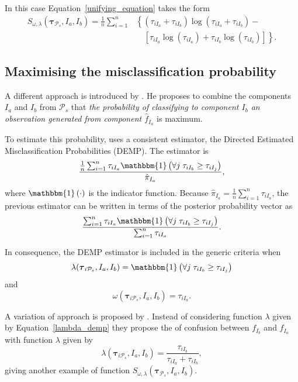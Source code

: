 \documentclass[10pt, a4paper]{article}
\newcommand{\m}[1]{\boldsymbol{#1}}
\begin{document}
\begin{spacing}{1.9}
In this case Equation~\ref{unifying_equation} takes the form
\[
\begin{split}
S_{\omega, \lambda}( \m\tau_{\mathcal{P}_s},  I_a,  I_b) = \frac{1}{n} \sum_{i=1}^n & \left\{(\tau_{iI_a}+\tau_{iI_b}) \log(\tau_{iI_a} + \tau_{iI_b}) - \right.\\ 
&\quad \left.\left[ \tau_{iI_a} \log(\tau_{iI_a}) + \tau_{iI_b} \log(\tau_{iI_b}) \right]\right\}.
\end{split}
\]


\subsection{Maximising the misclassification probability}
\label{missclassification_section}

A different approach is introduced by \cite{hennig2010methods}. He proposes to combine the components $I_a$ and $I_b$ from $ \mathcal{P}_s$ that \emph{the probability of classifying to component $I_b$ an observation generated from component $\hat{f}_{I_a}$ } is maximum.

To estimate this probability,  \cite{hennig2010methods} uses a consistent estimator, the Directed Estimated Misclassification Probabilities (DEMP). The estimator is
\[
\frac{ \frac{1}{n} \sum_{i=1}^n {\tau_{iI_a} \mathbbm{1}\left( \forall j\; \tau_{i I_{b}} \geq \tau_{iI_j} \right)}}{ \hat{\pi}_{I_a}},
\]
where $\mathbbm{1}\left( \cdot \right)$ is the indicator function. Because $ \hat{\pi}_{I_a} = \frac{1}{n} \sum_{i=1}^n \tau_{iI_a}$, the previous estimator can be written in terms of the posterior probability vector as
\begin{equation}\label{demp_criteria}
\frac{ \sum_{i=1}^n {\tau_{iI_a} \mathbbm{1}\left( \forall j\; \tau_{i I_{b}} \geq \tau_{iI_j} \right)}}{\sum_{i=1}^n \tau_{iI_a} }.
\end{equation}

In consequence, the DEMP estimator is included in the generic criteria when
\begin{equation}\label{lambda_demp}
\lambda(\m\tau_{i \mathcal{P}_s},  I_a,  I_b) = \mathbbm{1}\left( \forall j\; \tau_{i I_{b}} \geq \tau_{iI_j} \right)
\end{equation}
and
\[
\omega(\m\tau_{i \mathcal{P}_s},  I_a,  I_b) =  \tau_{iI_a}.
\]

A variation of \cite{hennig2010methods} approach is proposed by \cite{longford2014}. Instead of considering function $\lambda$ given by Equation~\ref{lambda_demp} they propose the of confusion between $f_{I_b}$ and $f_{I_a}$ with function $\lambda$ given by
\[
\lambda(\m\tau_{i \mathcal{P}_s},  I_a,  I_b) = \frac{\tau_{iI_b}}{\tau_{iI_a} + \tau_{iI_b}},
\]
giving another example of function $S_{\omega, \lambda}( \m\tau_{\mathcal{P}_s},  I_a,  I_b)$.


\end{spacing}
\end{document}
